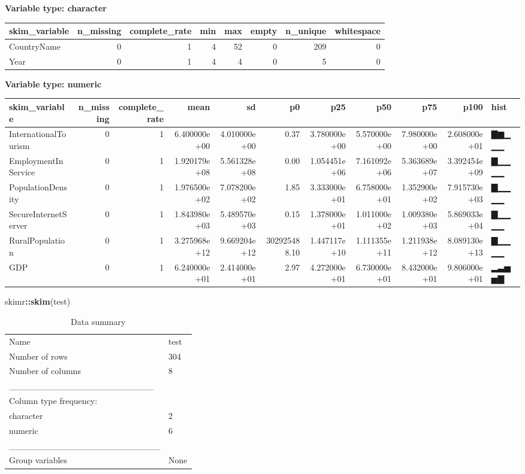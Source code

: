\documentclass[ignorenonframetext,]{beamer}
\newenvironment{Shaded}{\begin{snugshade}}{\end{snugshade}}
\newcommand{\KeywordTok}[1]{\textcolor[rgb]{0.13,0.29,0.53}{\textbf{#1}}}
\newcommand{\NormalTok}[1]{#1}
\newcommand{\OperatorTok}[1]{\textcolor[rgb]{0.81,0.36,0.00}{\textbf{#1}}}
\begin{document}
\begin{frame}[fragile]
\textbf{Variable type: character}

\begin{longtable}[]{@{}lrrrrrrr@{}}
\toprule
skim\_variable & n\_missing & complete\_rate & min & max & empty &
n\_unique & whitespace\tabularnewline
\midrule
\endhead
CountryName & 0 & 1 & 4 & 52 & 0 & 209 & 0\tabularnewline
Year & 0 & 1 & 4 & 4 & 0 & 5 & 0\tabularnewline
\bottomrule
\end{longtable}

\textbf{Variable type: numeric}

\begin{longtable}[]{@{}lrrrrrrrrrl@{}}
\toprule
skim\_variable & n\_missing & complete\_rate & mean & sd & p0 & p25 &
p50 & p75 & p100 & hist\tabularnewline
\midrule
\endhead
InternationalTourism & 0 & 1 & 6.400000e+00 & 4.010000e+00 & 0.37 &
3.780000e+00 & 5.570000e+00 & 7.980000e+00 & 2.608000e+01 &
▇▆▁▁▁\tabularnewline
EmploymentInService & 0 & 1 & 1.920179e+08 & 5.561328e+08 & 0.00 &
1.054451e+06 & 7.161092e+06 & 5.363689e+07 & 3.392454e+09 &
▇▁▁▁▁\tabularnewline
PopulationDensity & 0 & 1 & 1.976500e+02 & 7.078200e+02 & 1.85 &
3.333000e+01 & 6.758000e+01 & 1.352900e+02 & 7.915730e+03 &
▇▁▁▁▁\tabularnewline
SecureInternetServer & 0 & 1 & 1.843980e+03 & 5.489570e+03 & 0.15 &
1.378000e+01 & 1.011000e+02 & 1.009380e+03 & 5.869033e+04 &
▇▁▁▁▁\tabularnewline
RuralPopulation & 0 & 1 & 3.275968e+12 & 9.669204e+12 & 302925488.10 &
1.447117e+10 & 1.111355e+11 & 1.211938e+12 & 8.089130e+13 &
▇▁▁▁▁\tabularnewline
GDP & 0 & 1 & 6.240000e+01 & 2.414000e+01 & 2.97 & 4.272000e+01 &
6.730000e+01 & 8.432000e+01 & 9.806000e+01 & ▂▃▅▅▇\tabularnewline
\bottomrule
\end{longtable}

\begin{Shaded}
\begin{Highlighting}[]
\NormalTok{skimr}\OperatorTok{::}\KeywordTok{skim}\NormalTok{(test)}
\end{Highlighting}
\end{Shaded}

\begin{longtable}[]{@{}ll@{}}
\caption{Data summary}\tabularnewline
\toprule
\endhead
Name & test\tabularnewline
Number of rows & 304\tabularnewline
Number of columns & 8\tabularnewline
\_\_\_\_\_\_\_\_\_\_\_\_\_\_\_\_\_\_\_\_\_\_\_ &\tabularnewline
Column type frequency: &\tabularnewline
character & 2\tabularnewline
numeric & 6\tabularnewline
\_\_\_\_\_\_\_\_\_\_\_\_\_\_\_\_\_\_\_\_\_\_\_\_ &\tabularnewline
Group variables & None\tabularnewline
\bottomrule
\end{longtable}


\end{frame}
\end{document}
